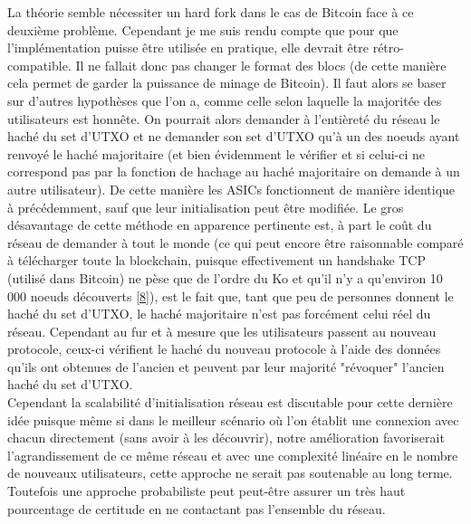 \documentclass[12pt,a4paper]{article}
\newcommand{\source}[1]{\hyperlink{#1}{[#1]}}
\begin{document}
	La théorie semble nécessiter un hard fork dans le cas de Bitcoin face à ce deuxième problème. Cependant je me suis rendu compte que pour que l'implémentation puisse être utilisée en pratique, elle devrait être rétro-compatible. Il ne fallait donc pas changer le format des blocs (de cette manière cela permet de garder la puissance de minage de Bitcoin). Il faut alors se baser sur d'autres hypothèses que l'on a, comme celle selon laquelle la majoritée des utilisateurs est honnête. On pourrait alors demander à l'entièreté du réseau le haché du set d'UTXO et ne demander son set d'UTXO qu'à un des noeuds ayant renvoyé le haché majoritaire (et bien évidemment le vérifier et si celui-ci ne correspond pas par la fonction de hachage au haché majoritaire on demande à un autre utilisateur). De cette manière les ASICs fonctionnent de manière identique à précédemment, sauf que leur initialisation peut être modifiée. Le gros désavantage de cette méthode en apparence pertinente est, à part le coût du réseau de demander à tout le monde (ce qui peut encore être raisonnable comparé à télécharger toute la blockchain, puisque effectivement un handshake TCP (utilisé dans Bitcoin) ne pèse que de l'ordre du Ko et qu'il n'y a qu'environ 10 000 noeuds découverts \source{8}), est le fait que, tant que peu de personnes donnent le haché du set d'UTXO, le haché majoritaire n'est pas forcément celui réel du réseau. Cependant au fur et à mesure que les utilisateurs passent au nouveau protocole, ceux-ci vérifient le haché du nouveau protocole à l'aide des données qu'ils ont obtenues de l'ancien et peuvent par leur majorité "révoquer" l'ancien haché du set d'UTXO.\\ %
	Cependant la scalabilité d'initialisation réseau est discutable pour cette dernière idée puisque même si dans le meilleur scénario où l'on établit une connexion avec chacun directement (sans avoir à les découvrir), notre amélioration favoriserait l'agrandissement de ce même réseau et avec une complexité linéaire en le nombre de nouveaux utilisateurs, cette approche ne serait pas soutenable au long terme. Toutefois une approche probabiliste peut peut-être assurer un très haut pourcentage de certitude en ne contactant pas l'ensemble du réseau.\\
\end{document}
